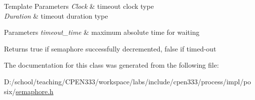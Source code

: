 \begin{DoxyTemplParams}{Template Parameters}
{\em Clock} & timeout clock type \\
\hline
{\em Duration} & timeout duration type \\
\hline
\end{DoxyTemplParams}

\begin{DoxyParams}{Parameters}
{\em timeout\+\_\+time} & maximum absolute time for waiting \\
\hline
\end{DoxyParams}
\begin{DoxyReturn}{Returns}
true if semaphore successfully decremented, false if timed-\/out 
\end{DoxyReturn}


The documentation for this class was generated from the following file\+:\begin{DoxyCompactItemize}
\item 
D\+:/school/teaching/\+C\+P\+E\+N333/workspace/labs/include/cpen333/process/impl/posix/\hyperlink{process_2impl_2posix_2semaphore_8h}{semaphore.\+h}\end{DoxyCompactItemize}
